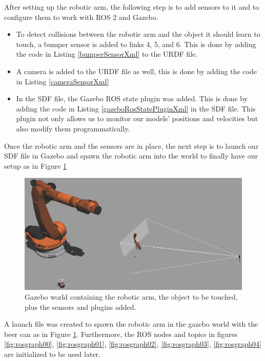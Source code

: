 \documentclass[12pt,oneside]{article}
\begin{document}
After setting up the robotic arm, the following step is to add sensors to it and to configure them to work with ROS 2 and Gazebo.
\begin{itemize}
\item To detect collisions between the robotic arm and the object it should learn to touch, a bumper sensor is added to links 4, 5, and 6. This is done by adding the code in Listing \ref{bumperSensorXml} to the URDF file.

\item A camera is added to the URDF file as well, this is done by adding the code in Listing \ref{cameraSensorXml}

\item In the SDF file, the Gazebo ROS state plugin was added. This is done by adding the code in Listing \ref{gazeboRosStatePluginXml} in the SDF file. This plugin not only allows us to monitor our models' positions and velocities but also modify them programmatically.
\end{itemize}

Once the robotic arm and the sensors are in place, the next step is to launch our SDF file in Gazebo and spawn the robotic arm into the world to finally have our setup as in Figure \ref{fig:kuka4}

\begin{figure}[H]
	\centering
	\includegraphics[width=0.95\linewidth]{kuka4}
	\caption[Gazebo World]{Gazebo world containing the robotic arm, the object to be touched, plus the sensors and plugins added.}
	\label{fig:kuka4}
\end{figure}

A launch file was created to spawn the robotic arm in the gazebo world with the beer can as in Figure \ref{fig:kuka4}. Furthermore, the ROS nodes and topics in figures \ref{fig:rosgraph00}, \ref{fig:rosgraph01}, \ref{fig:rosgraph02}, \ref{fig:rosgraph03}, \ref{fig:rosgraph04} are initialized to be used later.
\end{document}
